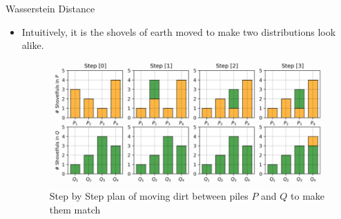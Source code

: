 \begin{frame}{Wasserstein Distance}
\begin{itemize}
    \item Intuitively, it is the shovels of earth moved to make two distributions look alike.
    \begin{figure}
        \centering
        \includegraphics[height=0.6\textheight, width=\textwidth, keepaspectratio]{images/gan/wgan_2.png}
        \caption*{Step by Step plan of moving dirt between piles $P$ and $Q$ to make them match}
    \end{figure}
    
\end{itemize}
    
\end{frame}

